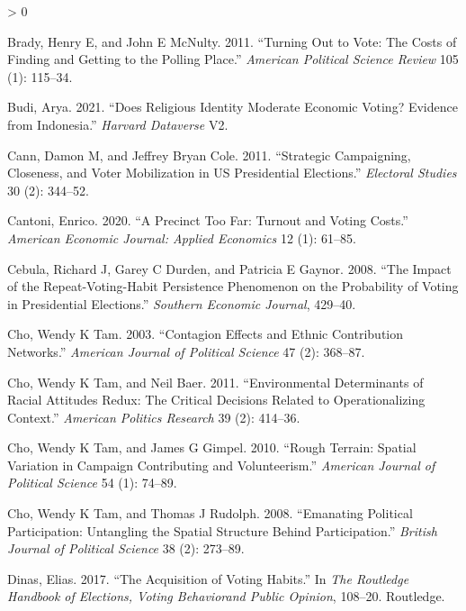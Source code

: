 \documentclass[
  12pt,
]{article}
\newlength{\cslhangindent}
\newenvironment{CSLReferences}[2] %
 {%
  \setlength{\parindent}{0pt}
  \ifodd #1 \everypar{\setlength{\hangindent}{\cslhangindent}}\ignorespaces\fi
  \ifnum #2 > 0
  \setlength{\parskip}{#2\baselineskip}
  \fi
 }%
 {}
\begin{document}
\begin{CSLReferences}{1}{0}
\leavevmode\hypertarget{ref-brady2011turning}{}%
Brady, Henry E, and John E McNulty. 2011. {``Turning Out to Vote: The
Costs of Finding and Getting to the Polling Place.''} \emph{American
Political Science Review} 105 (1): 115--34.

\leavevmode\hypertarget{ref-budi2021does}{}%
Budi, Arya. 2021. {``Does Religious Identity Moderate Economic Voting?
Evidence from Indonesia.''} \emph{Harvard Dataverse} V2.

\leavevmode\hypertarget{ref-cann2011strategic}{}%
Cann, Damon M, and Jeffrey Bryan Cole. 2011. {``Strategic Campaigning,
Closeness, and Voter Mobilization in US Presidential Elections.''}
\emph{Electoral Studies} 30 (2): 344--52.

\leavevmode\hypertarget{ref-cantoni2020precinct}{}%
Cantoni, Enrico. 2020. {``A Precinct Too Far: Turnout and Voting
Costs.''} \emph{American Economic Journal: Applied Economics} 12 (1):
61--85.

\leavevmode\hypertarget{ref-cebula2008impact}{}%
Cebula, Richard J, Garey C Durden, and Patricia E Gaynor. 2008. {``The
Impact of the Repeat-Voting-Habit Persistence Phenomenon on the
Probability of Voting in Presidential Elections.''} \emph{Southern
Economic Journal}, 429--40.

\leavevmode\hypertarget{ref-tam2003contagion}{}%
Cho, Wendy K Tam. 2003. {``Contagion Effects and Ethnic Contribution
Networks.''} \emph{American Journal of Political Science} 47 (2):
368--87.

\leavevmode\hypertarget{ref-tam2011environmental}{}%
Cho, Wendy K Tam, and Neil Baer. 2011. {``Environmental Determinants of
Racial Attitudes Redux: The Critical Decisions Related to
Operationalizing Context.''} \emph{American Politics Research} 39 (2):
414--36.

\leavevmode\hypertarget{ref-cho2010rough}{}%
Cho, Wendy K Tam, and James G Gimpel. 2010. {``Rough Terrain: Spatial
Variation in Campaign Contributing and Volunteerism.''} \emph{American
Journal of Political Science} 54 (1): 74--89.

\leavevmode\hypertarget{ref-cho2008emanating}{}%
Cho, Wendy K Tam, and Thomas J Rudolph. 2008. {``Emanating Political
Participation: Untangling the Spatial Structure Behind Participation.''}
\emph{British Journal of Political Science} 38 (2): 273--89.

\leavevmode\hypertarget{ref-dinas2017acquisition}{}%
Dinas, Elias. 2017. {``The Acquisition of Voting Habits.''} In \emph{The
Routledge Handbook of Elections, Voting Behaviorand Public Opinion},
108--20. Routledge.


\end{CSLReferences}
\end{document}
